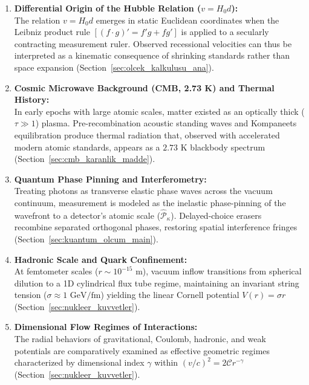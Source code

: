 \begin{enumerate}
      \item \textbf{Differential Origin of the Hubble Relation ($v = H_0 d$):} \\
            The relation $v = H_0 d$ emerges in static Euclidean coordinates when the Leibniz product rule $[(f\cdot g)' = f'g + fg']$ is applied to a secularly contracting measurement ruler. Observed recessional velocities can thus be interpreted as a kinematic consequence of shrinking standards rather than space expansion (Section~\ref{sec:olcek_kalkulusu_ana}).

      \item \textbf{Cosmic Microwave Background (CMB, 2.73 K) and Thermal History:} \\
            In early epochs with large atomic scales, matter existed as an optically thick ($\tau \gg 1$) plasma. Pre-recombination acoustic standing waves and Kompaneets equilibration produce thermal radiation that, observed with accelerated modern atomic standards, appears as a $2.73\text{ K}$ blackbody spectrum (Section~\ref{sec:cmb_karanlik_madde}).

      \item \textbf{Quantum Phase Pinning and Interferometry:} \\
            Treating photons as transverse elastic phase waves across the vacuum continuum, measurement is modeled as the inelastic phase-pinning of the wavefront to a detector's atomic scale ($\hat{\mathcal{P}}_\kappa$). Delayed-choice erasers~\cite{scully1982,kim2000} recombine separated orthogonal phases, restoring spatial interference fringes (Section~\ref{sec:kuantum_olcum_main}).

      \item \textbf{Hadronic Scale and Quark Confinement:} \\
            At femtometer scales ($r \sim 10^{-15}\text{ m}$), vacuum inflow transitions from spherical dilution to a 1D cylindrical flux tube regime, maintaining an invariant string tension ($\sigma \approx 1\text{ GeV/fm}$) yielding the linear Cornell potential $V(r) = \sigma r$ (Section~\ref{sec:nukleer_kuvvetler}).

      \item \textbf{Dimensional Flow Regimes of Interactions:} \\
            The radial behaviors of gravitational, Coulomb, hadronic, and weak potentials are comparatively examined as effective geometric regimes characterized by dimensional index $\gamma$ within $(v/c)^2 = 2\mathcal{C}r^{-\gamma}$ (Section~\ref{sec:nukleer_kuvvetler}).


\end{enumerate}
